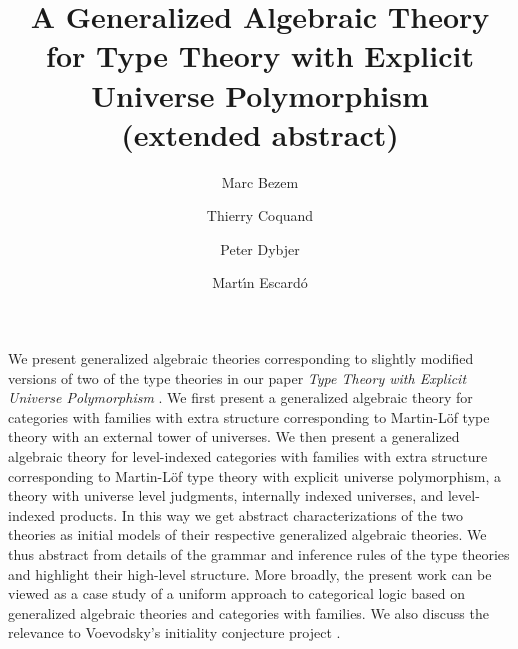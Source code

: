 \documentclass{easychair}
\begin{document}
\title{A Generalized Algebraic Theory\\ for Type Theory
with Explicit Universe Polymorphism\\(extended abstract)}
\author{
	Marc Bezem
\and Thierry Coquand
\and Peter Dybjer
\and Mart\'{\i}n Escard\'o
}

\maketitle

We present generalized algebraic theories corresponding to slightly modified versions of two of the type theories in our paper
{\em Type Theory with Explicit Universe Polymorphism} \cite{BezemCDE22}. We first present a generalized algebraic theory for categories with families with extra structure corresponding to Martin-Löf type theory with an external tower of universes. We then present a generalized algebraic theory for level-indexed categories with families with extra structure corresponding to Martin-Löf type theory with explicit universe polymorphism, a theory with universe level judgments, internally indexed universes, and level-indexed products. In this way we get abstract characterizations of the two theories as initial models of their respective generalized algebraic theories. We thus abstract from details of the grammar and inference rules of the type theories and highlight their high-level structure. More broadly, the present work can be viewed as a case study of a uniform approach to categorical logic based on generalized algebraic theories and categories with families. We also discuss the relevance to Voevodsky's initiality conjecture project \cite{voevodsky:initiality}. 
%
\end{document}
